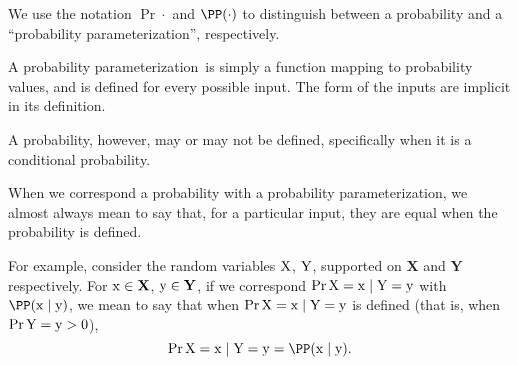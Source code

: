 \begin{note}
  \def\paramprob{probability parameterization}
  We use the notation $\Pr{\cdot}$ and $\PP(\cdot)$ to 
  distinguish between a probability and a ``\paramprob'',
  respectively.

  A \paramprob\ is simply a function mapping 
  to probability values, and is defined for every possible input.
  The form of the inputs are implicit in its definition.

  A probability, however, may or may not be defined, specifically
  when it is a conditional probability.

  When we correspond a probability with a \paramprob,
  we almost always mean to say that, for a particular input, 
  they are equal when the probability is defined.

  \def\X{{\mathbf X}}
  \def\XV{{\rm X}}
  \def\XX{{\rm x}}

  \def\Y{{\mathbf Y}}
  \def\YV{{\rm Y}}
  \def\YY{{\rm y}}
  For example, consider the random variables $\XV$, $\YV$,
  supported on $\X$ and $\Y$ respectively. For $\XX \in \X$, $\YY \in \Y$,
  if we correspond $\Pr{\XV = \XX \mid \YV = \YY}$ with $\PP(\XX \mid \YY)$,
  we mean to say that when $\Pr{\XV = \XX \mid \YV = \YY}$ is defined (that is, when $\Pr{\YV = \YY} > 0$),
  $$\Pr{\XV = \XX \mid \YV = \YY} = \PP(\XX \mid \YY).$$%
\end{note}
